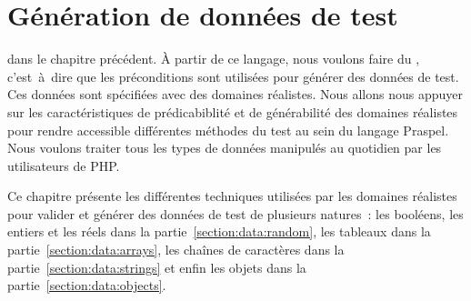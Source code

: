 \chapter{Génération de données de test}
\label{chapter:data}

\mminitoc

 dans le chapitre précédent. À partir de ce
langage, nous voulons faire du , c'est~à~dire
que les préconditions sont utilisées pour générer des données de test. Ces
données sont spécifiées avec des domaines réalistes. Nous allons nous appuyer
sur les caractéristiques de prédicabiblité et de générabilité des domaines
réalistes pour rendre accessible différentes méthodes du test au sein du langage
Praspel. Nous voulons traiter tous les types de données manipulés au quotidien
par les utilisateurs de PHP.

Ce chapitre présente les différentes techniques utilisées par les domaines
réalistes pour valider et générer des données de test de plusieurs natures~: les
booléens, les entiers et les réels dans la partie~\ref{section:data:random}, les
tableaux dans la partie~\ref{section:data:arrays}, les chaînes de caractères
dans la partie~\ref{section:data:strings} et enfin les objets dans la
partie~\ref{section:data:objects}.

